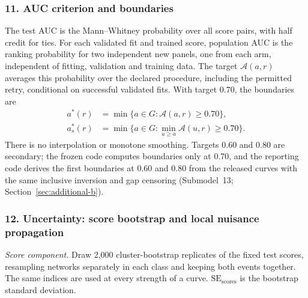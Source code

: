 \subsubsection*{11. AUC criterion and boundaries}
The test AUC is the Mann--Whitney probability over all score pairs, with half credit for ties. For each validated fit and trained score, population AUC is the ranking probability for two independent new panels, one from each arm, independent of fitting, validation and training data. The target $\mathcal A(a,r)$ averages this probability over the declared procedure, including the permitted retry, conditional on successful validated fits. With target 0.70, the boundaries are
\begin{align*}
a^*(r)&=\min\{a\in G:\mathcal A(a,r)\ge0.70\},\\
a^*_s(r)&=\min\{a\in G:\min_{u\ge a}\mathcal A(u,r)\ge0.70\}.
\end{align*}
There is no interpolation or monotone smoothing. Targets 0.60 and 0.80 are secondary; the frozen code computes boundaries only at 0.70, and the reporting code derives the first boundaries at 0.60 and 0.80 from the released curves with the same inclusive inversion and gap censoring (Submodel~13; Section~\ref{sec:additional-b}).

\subsubsection*{12. Uncertainty: score bootstrap and local nuisance propagation}
\emph{Score component.} Draw 2,000 cluster-bootstrap replicates of the fixed test scores, resampling networks separately in each class and keeping both events together. The same indices are used at every strength of a curve. $\mathrm{SE}_{\mathrm{scores}}$ is the bootstrap standard deviation.

